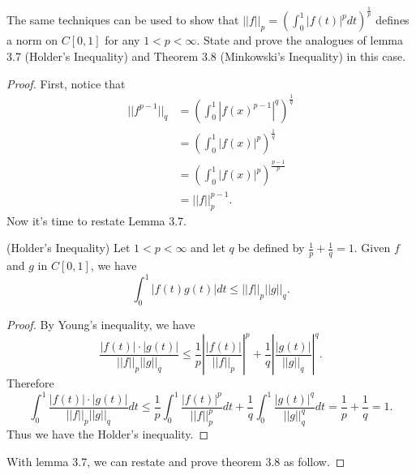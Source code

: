 \documentclass[12pt, a4paper]{article}
\theoremstyle{plain}
\begin{document}
\pagebreak

\begin{exercise}{25}
The same techniques can be used to show that $||f||_p=(\int_{0}^{1}{|f(t)|^p dt})^{\frac{1}{p}}$ defines a norm on $C[0,1]$ for any $1<p<\infty$. State and prove the analogues of lemma 3.7 (Holder's Inequality) and Theorem 3.8 (Minkowski's Inequality) in this case.
\end{exercise}
	\begin{proof}
	First, notice that
	\begin{align*}
	||f^{p-1}||_q&= \left(\int_{0}^{1}{|f(x)^{p-1}|^q}\right)^\frac{1}{q}\\
	&=\left(\int_{0}^{1}{|f(x)|^p}\right)^\frac{1}{q}\\
	&=\left(\int_{0}^{1}{|f(x)|^p}\right)^\frac{p-1}{p}\\
	&= ||f||^{p-1}_p.
	\end{align*}
	Now it's time to restate Lemma 3.7.
	\begin{lemma}{3.7}(Holder's Inequality)
	Let $1<p<\infty$ and let $q$ be defined by $\frac{1}{p}+\frac{1}{q}=1$. Given $f$ and $g$ in $C[0,1]$, we have
	\[
	\int_{0}^{1}{|f(t)g(t)|dt}\leq ||f||_p||g||_q.
	\]
	\end{lemma}
	
		\begin{proof}
		By Young's inequality, we have
		\[
		\frac{|f(t)|\cdot |g(t)|}{||f||_p||g||_q}\leq \frac{1}{p}\left|\frac{|f(t)|}{||f||_p}\right|^p + \frac{1}{q}\left|\frac{|g(t)|}{||g||_q}\right|^q.
		\]
		Therefore
		\[
		\int_{0}^{1}{\frac{|f(t)|\cdot |g(t)|}{||f||_p||g||_q}dt} \leq \frac{1}{p}\int_{0}^{1}{\frac{|f(t)|^p}{||f||_p^p}dt} + \frac{1}{q}\int_{0}^{1}{\frac{|g(t)|^q}{||g||_q^q}dt} = \frac{1}{p}+\frac{1}{q}=1.
		\]
		Thus we have the Holder's inequality.
		\end{proof}
	With lemma 3.7, we can restate and prove theorem 3.8 as follow.
	

\end{proof}
\end{document}
